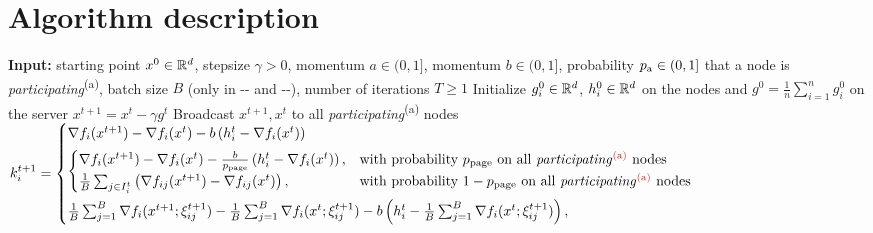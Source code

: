 \documentclass{article}
\newcommand*{\probavailable}{\ensuremath{p_{\textnormal{a}}}}
\newcommand*{\probpage}{\ensuremath{p_{\text{page}}}}
\begin{document}
\section{Algorithm description}

\begin{minipage}{\textwidth}
\begin{algorithm}[H]
  \caption{-}
  \label{alg:main_algorithm}
  \begin{algorithmic}[1]
  \STATE \textbf{Input:} starting point $x^0 \in \mathbb{R}^d$, stepsize $\gamma > 0$, momentum $a \in (0, 1]$, 
  momentum $b \in (0, 1]$, probability $\probavailable \in (0, 1]$ that a node is \textit{participating}\textsuperscript{\red (a)},
  batch size $B$ (only in -- and --), 
  number of iterations $T \geq 1$
  \STATE Initialize $g^0_i\in \mathbb{R}^d$, $h^0_i\in \mathbb{R}^d$ on the nodes and  $g^0 = \frac{1}{n}\sum_{i=1}^n g^0_i$ on the server
  \STATE $x^{t+1} = x^t - \gamma g^t$  
  \STATE Broadcast $x^{t+1}, x^{t}$ to all \textit{participating}\textsuperscript{\red (a)} nodes
      \STATE $k^{t+1}_i = 
      \begin{cases}
          \vspace{0.15cm}
          \nabla f_i(x^{t+1}) - \nabla f_i(x^{t}) - b \left(h^t_i - \nabla f_i(x^{t})\right) \\
          \vspace{0.15cm}
          \begin{cases}
              \nabla f_i(x^{t+1}) - \nabla f_i(x^{t}) - \frac{b}{\probpage} \left(h^t_i - \nabla f_i(x^{t})\right),& \textnormal{with probability $\probpage$ on all \textit{participating}\textsuperscript{\red (a)} nodes} \\
              \frac{1}{B}\sum_{j \in I^t_i}\left(\nabla f_{ij}(x^{t+1}) - \nabla f_{ij}(x^{t})\right), & \textnormal{with probability $1 - \probpage$ on all \textit{participating}\textsuperscript{\red (a)} nodes} 
          \end{cases}  \\
          \frac{1}{B}\sum_{j=1}^B \nabla f_i(x^{t+1};\xi^{t+1}_{ij}) - \frac{1}{B}\sum_{j=1}^B \nabla f_i(x^{t};\xi^{t+1}_{ij}) - b \left(h^t_i - \frac{1}{B}\sum_{j=1}^B \nabla f_i(x^{t};\xi^{t+1}_{ij})\right),
      \end{cases}$

\end{algorithmic}
\end{algorithm}
\end{minipage}
\end{document}
